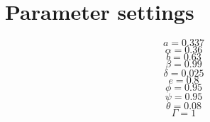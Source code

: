 \section{Parameter settings}

\begin{equation}
a = 0.337
\end{equation}
\begin{equation}
\alpha = 0.36
\end{equation}
\begin{equation}
b = 0.63
\end{equation}
\begin{equation}
\beta = 0.99
\end{equation}
\begin{equation}
\delta = 0.025
\end{equation}
\begin{equation}
e = 0.8
\end{equation}
\begin{equation}
\phi = 0.95
\end{equation}
\begin{equation}
\psi = 0.95
\end{equation}
\begin{equation}
\theta = 0.08
\end{equation}
\begin{equation}
\Gamma = 1
\end{equation}


